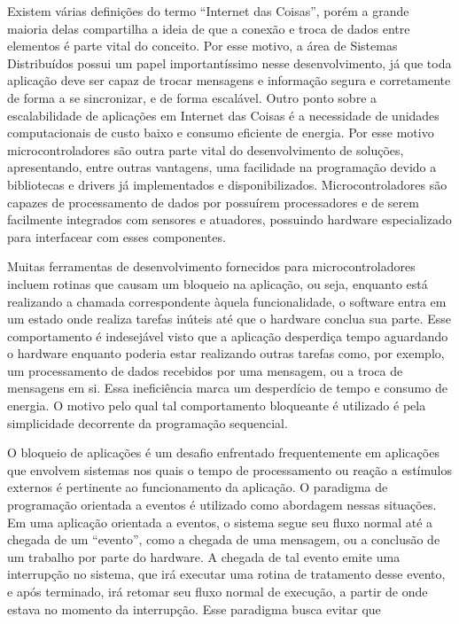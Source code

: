 \documentclass[11pt]{article}
\begin{document}
\tab Existem várias definições do termo “Internet das
Coisas”, porém a grande maioria delas compartilha a ideia de que a conexão e troca de dados
entre elementos é parte vital do conceito. Por esse motivo, a área de Sistemas Distribuídos possui um
papel importantíssimo nesse desenvolvimento, já que toda aplicação deve ser capaz de trocar
mensagens e informação segura e corretamente de forma a se sincronizar, e de forma escalável. \cite{singh2014}
Outro ponto sobre a escalabilidade de aplicações em Internet das Coisas é a necessidade de unidades
computacionais de custo baixo e consumo eficiente de energia. Por esse motivo microcontroladores
são outra parte vital do desenvolvimento de soluções, apresentando, entre outras vantagens, uma
facilidade na programação devido a bibliotecas e drivers já implementados e disponibilizados.
Microcontroladores são capazes de processamento de dados por possuírem processadores e de
serem facilmente integrados com sensores e atuadores, possuindo hardware especializado para
interfacear com esses componentes.
\par Muitas ferramentas de desenvolvimento fornecidos para microcontroladores incluem rotinas que causam um bloqueio na
aplicação, ou seja, enquanto está realizando a chamada correspondente àquela funcionalidade, o
software entra em um estado onde realiza tarefas inúteis até que o hardware conclua sua
parte. Esse comportamento é indesejável visto que a aplicação desperdiça tempo aguardando o
hardware enquanto poderia estar realizando outras tarefas como, por exemplo, um processamento de
dados recebidos por uma mensagem, ou a troca de mensagens em si. Essa ineficiência marca um
desperdício de tempo e consumo de energia. O motivo pelo qual tal comportamento bloqueante é utilizado é pela simplicidade decorrente da programação sequencial.
\par O bloqueio de aplicações é um desafio enfrentado frequentemente em aplicações que envolvem
sistemas nos quais o tempo de processamento ou reação a estímulos externos é pertinente ao
funcionamento da aplicação. O paradigma de programação orientada a eventos é utilizado como abordagem nessas situações. Em uma aplicação orientada a eventos, o sistema segue
seu fluxo normal até a chegada de um “evento”, como a chegada de uma mensagem, ou a conclusão
de um trabalho por parte do hardware. A chegada de tal evento emite uma interrupção no sistema, que
irá executar uma rotina de tratamento desse evento, e após terminado, irá retomar seu fluxo normal
de execução, a partir de onde estava no momento da interrupção. Esse paradigma busca evitar que
\end{document}
